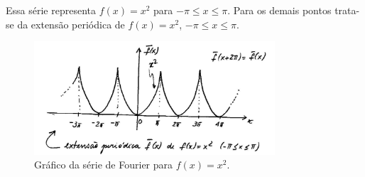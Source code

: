 \begin{obs}
    Essa s\'{e}rie representa $f(x) = x^2$ para $-\pi \leq x \leq \pi$. Para os demais pontos trata-se da extens\~{a}o peri\'{o}dica de $f(x) = x^2$, $-\pi \leq x \leq \pi$.
\end{obs}

\begin{figure}[!htb]
    \centering
    \includegraphics[width=0.8\textwidth]{figuras/serie_fourier_grafico01.jpg}
    \caption{Gr\'{a}fico da s\'{e}rie de Fourier para $f(x) = x^2$.}
    \label{fig:serie_fourier_grafico01}
\end{figure}

